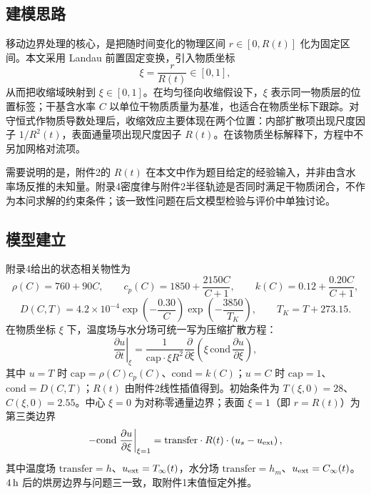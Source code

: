 \documentclass[UTF8,a4paper,12pt]{ctexart}
\numberwithin{equation}{section}
\begin{document}
\subsection{建模思路}
移动边界处理的核心，是把随时间变化的物理区间 $r\in[0,R(t)]$ 化为固定区间。本文采用 Landau 前置固定变换，引入物质坐标
\begin{equation}
  \xi=\frac{r}{R(t)}\in[0,1],
\end{equation}
从而把收缩域映射到 $\xi\in[0,1]$。在均匀径向收缩假设下，$\xi$ 表示同一物质层的位置标签；干基含水率 $C$ 以单位干物质质量为基准，也适合在物质坐标下跟踪。对守恒式作物质导数处理后，收缩效应主要体现在两个位置：内部扩散项出现尺度因子 $1/R^2(t)$，表面通量项出现尺度因子 $R(t)$。在该物质坐标解释下，方程中不另加网格对流项。

需要说明的是，附件2的 $R(t)$ 在本文中作为题目给定的经验输入，并非由含水率场反推的未知量。附录4密度律与附件2半径轨迹是否同时满足干物质闭合，不作为本问求解的约束条件；该一致性问题在后文模型检验与评价中单独讨论。

\subsection{模型建立}
附录4给出的状态相关物性为
\begin{equation}
  \rho(C)=760+90C,\qquad
  c_p(C)=1850+\frac{2150C}{C+1},\qquad
  k(C)=0.12+\frac{0.20C}{C+1},
\end{equation}
\begin{equation}
  D(C,T)=4.2\times10^{-4}\exp\left(-\frac{0.30}{C}\right)
  \exp\left(-\frac{3850}{T_K}\right),\qquad T_K=T+273.15.
\end{equation}
在物质坐标 $\xi$ 下，温度场与水分场可统一写为压缩扩散方程：
\begin{equation}
  \left.\frac{\partial u}{\partial t}\right|_{\xi}
  =\frac{1}{\mathrm{cap}\cdot\xi R^2}
  \frac{\partial}{\partial\xi}\left(\xi\,\mathrm{cond}\,\frac{\partial u}{\partial\xi}\right),
\end{equation}
其中 $u=T$ 时 $\mathrm{cap}=\rho(C)c_p(C)$、$\mathrm{cond}=k(C)$；$u=C$ 时 $\mathrm{cap}=1$、$\mathrm{cond}=D(C,T)$；$R(t)$ 由附件2线性插值得到。初始条件为 $T(\xi,0)=28$、$C(\xi,0)=2.55$。中心 $\xi=0$ 为对称零通量边界；表面 $\xi=1$（即 $r=R(t)$）为第三类边界
\begin{equation}
  -\mathrm{cond}\left.\frac{\partial u}{\partial\xi}\right|_{\xi=1}
  =\mathrm{transfer}\cdot R(t)\cdot\left(u_s-u_{\rm ext}\right),
\end{equation}
其中温度场 $\mathrm{transfer}=h$、$u_{\rm ext}=T_\infty(t)$，水分场 $\mathrm{transfer}=h_m$、$u_{\rm ext}=C_\infty(t)$。$4\rm\,h$ 后的烘房边界与问题三一致，取附件1末值恒定外推。
\end{document}
